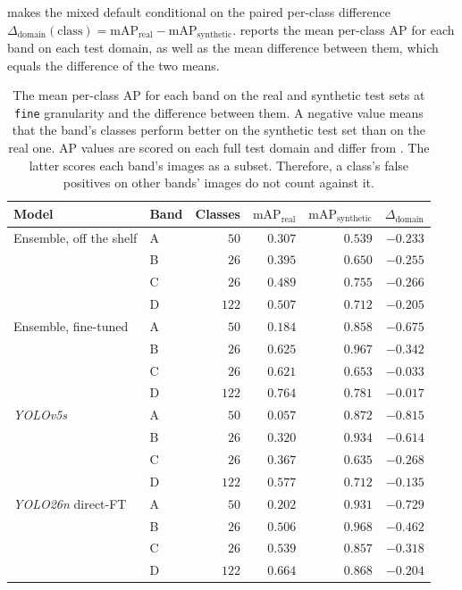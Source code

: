  makes the mixed default conditional on the paired per-class difference $\Delta_{\text{domain}}(\text{class}) = \mathrm{mAP}_{\text{real}} - \mathrm{mAP}_{\text{synthetic}}$.  reports the mean per-class AP for each band on each test domain, as well as the mean difference between them, which equals the difference of the two means.

\begin{table}[htbp]
\centering
\caption[Mean domain-shift delta per band]{The mean per-class AP for each band on the real and synthetic test sets at \texttt{fine} granularity and the difference between them. A negative value means that the band's classes perform better on the synthetic test set than on the real one. AP values are scored on each full test domain and differ from . The latter scores each band's images as a subset. Therefore, a class's false positives on other bands' images do not count against it.}
\label{tab:domain-shift-delta}
\small
\begin{tabular}{@{}llrrrr@{}}
\toprule
Model & Band & Classes & $\mathrm{mAP}_{\text{real}}$ & $\mathrm{mAP}_{\text{synthetic}}$ & $\Delta_{\text{domain}}$ \\
\midrule
Ensemble, off the shelf & A & $50$ & $0.307$ & $0.539$ & $-0.233$ \\
 & B & $26$ & $0.395$ & $0.650$ & $-0.255$ \\
 & C & $26$ & $0.489$ & $0.755$ & $-0.266$ \\
 & D & $122$ & $0.507$ & $0.712$ & $-0.205$ \\
\midrule
Ensemble, fine-tuned & A & $50$ & $0.184$ & $0.858$ & $-0.675$ \\
 & B & $26$ & $0.625$ & $0.967$ & $-0.342$ \\
 & C & $26$ & $0.621$ & $0.653$ & $-0.033$ \\
 & D & $122$ & $0.764$ & $0.781$ & $-0.017$ \\
\midrule
\textit{YOLOv5s} & A & $50$ & $0.057$ & $0.872$ & $-0.815$ \\
 & B & $26$ & $0.320$ & $0.934$ & $-0.614$ \\
 & C & $26$ & $0.367$ & $0.635$ & $-0.268$ \\
 & D & $122$ & $0.577$ & $0.712$ & $-0.135$ \\
\midrule
\textit{YOLO26n} direct-FT & A & $50$ & $0.202$ & $0.931$ & $-0.729$ \\
 & B & $26$ & $0.506$ & $0.968$ & $-0.462$ \\
 & C & $26$ & $0.539$ & $0.857$ & $-0.318$ \\
 & D & $122$ & $0.664$ & $0.868$ & $-0.204$ \\
\bottomrule
\end{tabular}
\end{table}


